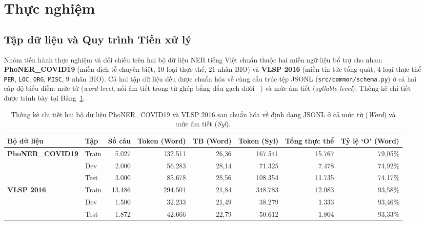 \section{Thực nghiệm}
\label{sec:experiments}

\subsection{Tập dữ liệu và Quy trình Tiền xử lý}
\label{sec:exp-data}

Nhóm tiến hành thực nghiệm và đối chiếu trên hai bộ dữ liệu NER tiếng Việt chuẩn thuộc hai miền ngữ liệu bổ trợ cho nhau: \textbf{PhoNER\_COVID19} \citep{truong-etal-2021-covid} (miền dịch tễ chuyên biệt, 10 loại thực thể, 21 nhãn BIO) và \textbf{VLSP 2016} \citep{nguyen2016vlsp} (miền tin tức tổng quát, 4 loại thực thể \texttt{PER}, \texttt{LOC}, \texttt{ORG}, \texttt{MISC}, 9 nhãn BIO). Cả hai tập dữ liệu đều được chuẩn hóa về cùng cấu trúc tệp JSONL (\texttt{src/common/schema.py}) ở cả hai cấp độ biểu diễn: mức từ (\textit{word-level}, nối âm tiết trong từ ghép bằng dấu gạch dưới \texttt{\_}) và mức âm tiết (\textit{syllable-level}). Thống kê chi tiết được trình bày tại Bảng~\ref{tab:dataset-stats}.

\begin{table}[t]
\centering
\small
\begin{tabular}{llrrrrrr}
\hline
\textbf{Bộ dữ liệu} & \textbf{Tập} & \textbf{Số câu} & \textbf{Token (Word)} & \textbf{TB (Word)} & \textbf{Token (Syl)} & \textbf{Tổng thực thể} & \textbf{Tỷ lệ `O' (Word)} \\
\hline
\multirow{3}{*}{\textbf{PhoNER\_COVID19}}
  & Train & 5.027  & 132.511 & 26,36 & 167.541 & 15.767 & 79,05\% \\
  & Dev   & 2.000  & 56.283  & 28,14 & 71.325  & 7.478  & 74,92\% \\
  & Test  & 3.000  & 85.678  & 28,56 & 108.354 & 11.735 & 74,17\% \\
\hline
\multirow{3}{*}{\textbf{VLSP 2016}}
  & Train & 13.486 & 294.501 & 21,84 & 348.783 & 12.083 & 93,58\% \\
  & Dev   & 1.500  & 32.233  & 21,49 & 38.279  & 1.333  & 93,46\% \\
  & Test  & 1.872  & 42.666  & 22,79 & 50.612  & 1.804  & 93,33\% \\
\hline
\end{tabular}
\caption{Thống kê chi tiết hai bộ dữ liệu PhoNER\_COVID19 và VLSP 2016 sau chuẩn hóa về định dạng JSONL ở cả mức từ (\textit{Word}) và mức âm tiết (\textit{Syl}).}
\label{tab:dataset-stats}
\end{table}

